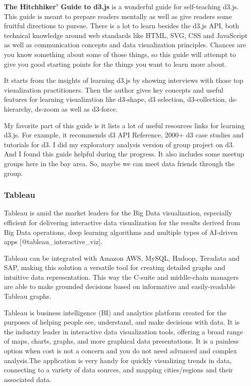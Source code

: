 \documentclass[]{book}
\theoremstyle{definition}
\theoremstyle{definition}
\theoremstyle{definition}
\theoremstyle{remark}
\begin{document}
\textbf{The Hitchhiker' Guide to d3.js} is a wonderful guide for
self-teaching d3.js. This guide is meant to prepare readers mentally as
well as give readers some fruitful directions to pursue. There is a lot
to learn besides the d3.js API, both technical knowledge around web
standards like HTML, SVG, CSS and JavaScript as well as communication
concepts and data visualization principles. Chances are you know
something about some of those things, so this guide will attempt to give
you good starting points for the things you want to learn more about.

It starts from the insights of learning d3.js by showing interviews with
those top visualization practitioners. Then the author gives key
concepts and useful features for learning visualization like d3-shape,
d3 selection, d3-collection, ds-hierarchy, ds-zoom as well as d3-force.

My favorite part of this guide is it lists a lot of useful resources
links for learning d3.js. For example, it recommends d3 API Reference,
2000+ d3 case studies and tutorials for d3. I did my exploratory
analysis version of group project on d3. And I found this guide helpful
during the progress. It also includes some meetup groups here in the bay
area. So, maybe we can meet data friends through the group.

\subsubsection{Tableau}\label{tableau}

Tableau is amid the market leaders for the Big Data visualization,
especially efficient for delivering interactive data visualization for
the results derived from Big Data operations, deep learning algorithms
and multiple types of AI-driven apps {[}@tableau\_interactive\_viz{]}.

Tableau can be integrated with Amazon AWS, MySQL, Hadoop, Teradata and
SAP, making this solution a versatile tool for creating detailed graphs
and intuitive data representation. This way the C-suite and middle-chain
managers are able to make grounded decisions based on informative and
easily-readable Tableau graphs.

Tableau is business intelligence (BI) and analytics platform created for
the purposes of helping people see, understand, and make decisions with
data. It is the industry leader in interactive data visualization tools,
offering a broad range of maps, charts, graphs, and more graphical data
presentations. It is a painless option when cost is not a concern and
you do not need advanced and complex analysis.The application is very
handy for quickly visualizing trends in data, connecting to a variety of
data sources, and mapping cities/regions and their associated data.
\end{document}
